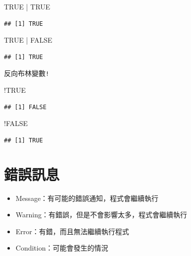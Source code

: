 \documentclass[]{book}
\newenvironment{Shaded}{\begin{snugshade}}{\end{snugshade}}
\newcommand{\StringTok}[1]{\textcolor[rgb]{0.31,0.60,0.02}{{#1}}}
\newcommand{\OtherTok}[1]{\textcolor[rgb]{0.56,0.35,0.01}{{#1}}}
\newcommand{\NormalTok}[1]{{#1}}
\providecommand{\tightlist}{%
  \setlength{\itemsep}{0pt}\setlength{\parskip}{0pt}}
\theoremstyle{definition}
\theoremstyle{definition}
\theoremstyle{remark}
\begin{document}
\begin{Shaded}
\begin{Highlighting}[]
\OtherTok{TRUE} \NormalTok{|}\StringTok{ }\OtherTok{TRUE}
\end{Highlighting}
\end{Shaded}

\begin{verbatim}
## [1] TRUE
\end{verbatim}

\begin{Shaded}
\begin{Highlighting}[]
\OtherTok{TRUE} \NormalTok{|}\StringTok{ }\OtherTok{FALSE}
\end{Highlighting}
\end{Shaded}

\begin{verbatim}
## [1] TRUE
\end{verbatim}

反向布林變數\texttt{!}

\begin{Shaded}
\begin{Highlighting}[]
\NormalTok{!}\OtherTok{TRUE}
\end{Highlighting}
\end{Shaded}

\begin{verbatim}
## [1] FALSE
\end{verbatim}

\begin{Shaded}
\begin{Highlighting}[]
\NormalTok{!}\OtherTok{FALSE}
\end{Highlighting}
\end{Shaded}

\begin{verbatim}
## [1] TRUE
\end{verbatim}

\section{錯誤訊息}

\begin{itemize}
\tightlist
\item
  Message：有可能的錯誤通知，程式會繼續執行
\item
  Warning：有錯誤，但是不會影響太多，程式會繼續執行
\item
  Error：有錯，而且無法繼續執行程式
\item
  Condition：可能會發生的情況
\end{itemize}
\end{document}

